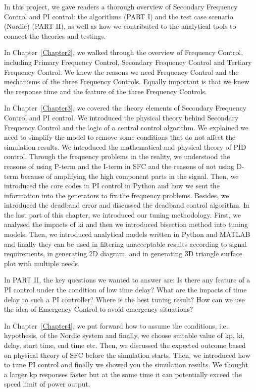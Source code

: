 In this project, we gave readers a thorough overview of Secondary Frequency Control and PI control: the algorithms (PART I) and the test case scenario (Nordic) (PART II), as well as how we contributed to the analytical tools to connect the theories and testings. 

In Chapter~\ref{Chapter2}, we walked through the overview of Frequency Control, including Primary Frequency Control, Secondary Frequency Control and Tertiary Frequency Control. We knew the reasons we need Frequency Control and the mechanisms of the three Frequency Controls. Equally important is that we knew the response time and the feature of the three Frequency Controls. 

In Chapter~\ref{Chapter3}, we covered the theory elements of Secondary Frequency Control and PI control. We introduced the physical theory behind Secondary Frequency Control and the logic of a central control algorithm. We explained we need to simplify the model to remove some conditions that do not affect the simulation results. We introduced the mathematical and physical theory of PID control. Through the frequency problems in the reality, we understood the reasons of using P-term and the I-term in SFC and the reasons of not using D-term because of amplifying the high component parts in the signal. Then, we introduced the core codes in PI control in Python and how we sent the information into the generators to fix the frequency problems. Besides, we introduced the deadband error and discussed the deadband control algorithm. In the last part of this chapter, we introduced our tuning methodology. First, we analysed the impacts of ki and then we introduced bisection method into tuning models. Then, we introduced analytical models written in Python and MATLAB and finally they can be used in filtering unacceptable results according to signal requirements, in generating 2D diagram, and in generating 3D triangle surface plot with multiple needs. 

In PART II, the key questions we wanted to answer are: Is there any feature of a PI control under the condition of low time delay? What are the impacts of time delay to such a PI controller? Where is the best tuning result? How can we use the idea of Emergency Control to avoid emergency situations? 

In Chapter~\ref{Chapter4}, we put forward how to assume the conditions, i.e. hypothesis, of the Nordic system and finally, we choose suitable value of kp, ki, delay, start time, end time etc. Then, we discussed the expected outcome based on physical theory of SFC before the simulation starts. Then, we introduced how to tune PI control and finally we showed you the simulation results. We thought a larger kp responses faster but at the same time it can potentially exceed the speed limit of power output.

